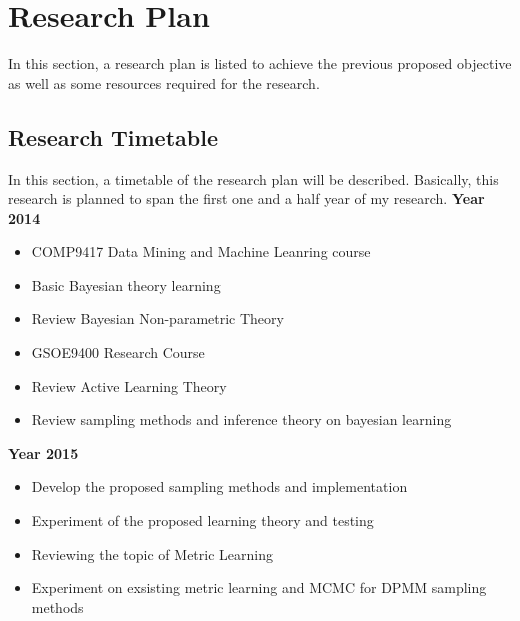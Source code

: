 
\section{Research Plan}
In this section, a research plan is listed to achieve the previous proposed objective as well as some resources required for the research.
\subsection{Research Timetable}
In this section, a timetable of the research plan will be described. Basically, this research is planned to span the first one and a half year of my research.
\vskip 1cm
\textbf{\large{Year 2014}}
\begin{itemize}
\item COMP9417 Data Mining and Machine Leanring course
\item Basic Bayesian theory learning
\item Review Bayesian Non-parametric Theory
\item GSOE9400 Research Course
\item Review Active Learning Theory
\item Review sampling methods and inference theory on bayesian learning
\end{itemize}
\vskip 1cm
\textbf{\large{Year 2015}}
\begin{itemize}
\item Develop the proposed sampling methods and implementation
\item Experiment of the proposed learning theory and testing
\item Reviewing the topic of Metric Learning
\item Experiment on exsisting metric learning and MCMC for DPMM sampling methods 
\end{itemize}